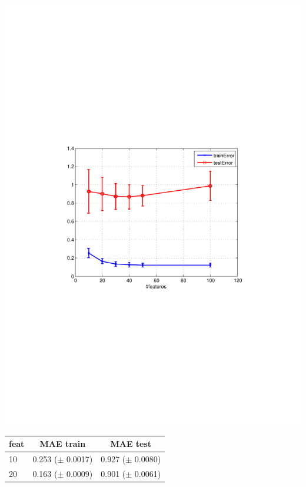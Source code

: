  \begin{minipage}{\textwidth}
  \begin{minipage}[b]{0.45\textwidth}
\centering
    \includegraphics[clip, trim=4cm 9.2cm 3.5cm 9cm, width=\textwidth]{figures/ALS_features.pdf}
    \label{fig:ALS_features}
  \end{minipage}
  \hfill
  \begin{minipage}[b]{0.5\textwidth}
\begin{center}
  \begin{tabular}{ |l | c | c| }
    \hline
     feat & MAE train & MAE test \\ \hline
     10   & 0.253 ($\pm$  0.0017) &  0.927 ($\pm$ 0.0080) \\ \hline
     20  &  0.163 ($\pm$  0.0009) &  0.901 ($\pm$  0.0061) \\ \hline

\end{tabular}
\end{center}
\end{minipage}
\end{minipage}
